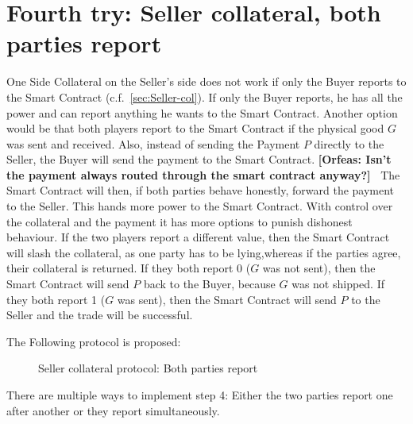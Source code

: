 \documentclass{cacthesis}
\newcommand{\authnote}[3]{{ \footnotesize \textbf{#1[#2: #3]~}}}
\newcommand{\orfnote}[1]{\authnote{\color{blue}}{Orfeas}{#1}}
\begin{document}
\section{Fourth try: Seller collateral, both parties report}
\label{sec:Sellercol-both-report}
One Side Collateral on the Seller's side does not work if only the Buyer reports
to the Smart Contract (c.f.~\ref{sec:Seller-col}). If only the Buyer reports, he has all the power and can report anything he wants to the Smart Contract.
Another option would be that both players report to the Smart Contract if the physical good $G$ was sent and received.
Also, instead of sending the Payment $P$ directly to the Seller, the Buyer will
send the payment to the Smart Contract. \orfnote{Isn't the payment always routed
through the smart contract anyway?} The Smart Contract will then, if both parties behave honestly, forward the payment to the Seller. This hands more power to the Smart Contract. With control over the collateral and the payment it has more options to punish dishonest behaviour. 
If the two players report a different value, then the Smart Contract will slash
the collateral, as one party has to be lying,whereas if the parties
agree, their collateral is returned. If they both report 0 ($G$ was not sent),
then the Smart Contract will send $P$ back to the Buyer, because $G$ was not
shipped. If they both report 1 ($G$ was sent), then the Smart Contract will send
$P$ to the Seller and the trade will be successful.\newline

The Following protocol is proposed:
\begin{figure}[htb!]
    \centering
    \caption{Seller collateral protocol: Both parties report}
    \label{pro:Seller-col-both-report}
\end{figure}

There are multiple ways to implement step 4: Either the two parties report one after another or they report simultaneously.
\end{document}
